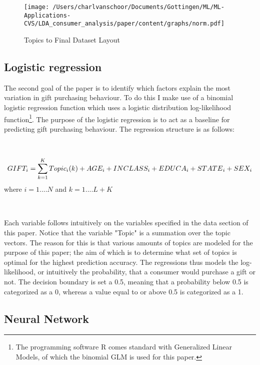 \begin{figure}[!h]
\texttt{[image: /Users/charlvanschoor/Documents/Gottingen/ML/ML-Applications-CVS/LDA\_consumer\_analysis/paper/content/graphs/norm.pdf]}
\caption{Topics to Final Dataset Layout}
\end{figure}


\subsection{Logistic regression} %
\label{sub:logistic_regression}

The second goal of the paper is to identify which factors explain the most variation in gift purchasing behaviour. To do this I make use of a binomial logistic regression function which uses a logistic distribution log-likelihood function\footnote{The programming software R comes standard with Generalized Linear Models, of which the binomial GLM is used for this paper.}. The purpose of the logistic regression is to act as a baseline for predicting gift purchasing behaviour. The regression structure is as follows:

\

\begin{equation}\centering
GIF{T_i} = \sum\limits_{k = 1}^K {Topi{c_i}(k)}  + AG{E_i} + INCLAS{S_i} + EDUC{A_i} + STATE{_i} + SE{X_i}
\end{equation}
where $i = 1....N$ and $k = 1....L + K$

\

Each variable follows intuitively on the variables specified in the data section of this paper. Notice that the variable "Topic" is a summation over the topic vectors. The reason for this is that various amounts of topics are modeled for the purpose of this paper; the aim of which is to determine what set of topics is optimal for the highest prediction accuracy. The regressions thus models the log-likelihood, or intuitively the probability, that a consumer would purchase a gift or not. The decision boundary is set a 0.5, meaning that a probability below 0.5 is categorized as a 0, whereas a value equal to or above 0.5 is categorized as a 1. 



\subsection{Neural Network} %
\label{sub:neural_network}

